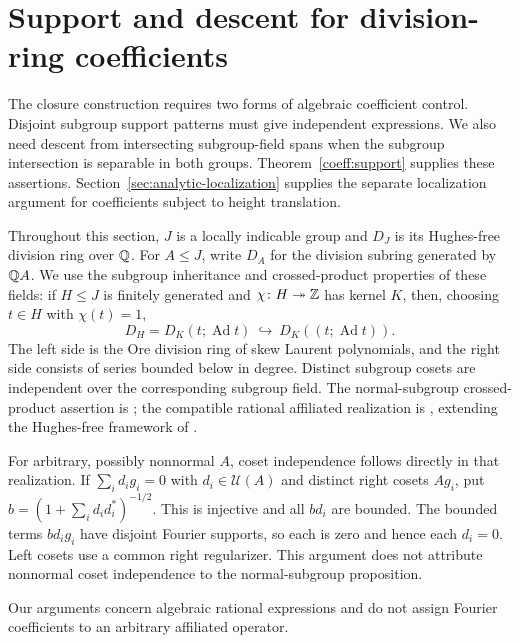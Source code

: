 \section{Support and descent for division-ring coefficients}
\label{sec:04-coefficients}

The closure construction requires two forms of algebraic coefficient
control. Disjoint subgroup support patterns must give independent
expressions. We also need descent from intersecting subgroup-field
spans when the subgroup intersection is separable in both groups.
Theorem~\ref{coeff:support} supplies these assertions.
Section~\ref{sec:analytic-localization} supplies the
separate localization argument for coefficients subject to height
translation.

Throughout this section, \(J\) is a locally indicable group and \(D_J\)
is its Hughes-free division ring over \(\mathbb Q\). For \(A\le J\), write
\(D_A\) for the division subring generated by \(\mathbb Q A\). We use the
subgroup inheritance and crossed-product properties of these fields:
if \(H\le J\) is finitely generated and
\(\chi\colon H\twoheadrightarrow\mathbb Z\) has kernel \(K\), then, choosing
\(t\in H\) with \(\chi(t)=1\),
\begin{equation}\label{coeff:cyclic-field}
 D_H=D_K(t;\operatorname{Ad}t)
 \ \hookrightarrow\ 
 D_K((t;\operatorname{Ad}t)).
\end{equation}
The left side is the Ore division ring of skew Laurent polynomials,
and the right side consists of series bounded below in degree. Distinct
subgroup cosets are independent over the corresponding subgroup field.
The normal-subgroup crossed-product assertion is
\cite[Section~2.3 and Proposition~2.2]{JaikinUniversality2021}; the
compatible rational affiliated realization is
\cite[Corollaries~6.2--6.3]{JaikinLopezAlvarez2020}, extending the
Hughes-free framework of \cite{Hughes1970}.

For arbitrary, possibly nonnormal $A$, coset independence follows
directly in that realization. If $\sum_i d_i g_i=0$ with
$d_i\in\mathcal U(A)$ and distinct right cosets $Ag_i$, put
$b=(1+\sum_i d_i d_i^*)^{-1/2}$. This is injective and all $bd_i$
are bounded. The bounded terms $bd_i g_i$ have disjoint Fourier
supports, so each is zero and hence each $d_i=0$. Left cosets use
a common right regularizer. This argument does not attribute
nonnormal coset independence to the normal-subgroup proposition.

Our arguments concern algebraic rational expressions and do not assign
Fourier coefficients to an arbitrary affiliated operator.

